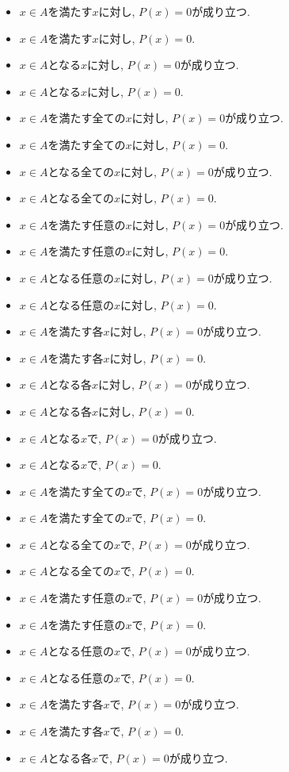 \documentclass[a4paper,12pt,draft]{amsart}
\newcommand{\PPP}[1]{P(#1)=0}
\begin{document}
\begin{itemize}
\item $x\in A$を満たす$x$に対し, $\PPP{x}$が成り立つ.
\item $x\in A$を満たす$x$に対し, $\PPP{x}$.
\item $x\in A$となる$x$に対し, $\PPP{x}$が成り立つ.
\item $x\in A$となる$x$に対し, $\PPP{x}$.
\item $x\in A$を満たす全ての$x$に対し, $\PPP{x}$が成り立つ.
\item $x\in A$を満たす全ての$x$に対し, $\PPP{x}$.
\item $x\in A$となる全ての$x$に対し, $\PPP{x}$が成り立つ.
\item $x\in A$となる全ての$x$に対し, $\PPP{x}$.
\item $x\in A$を満たす任意の$x$に対し, $\PPP{x}$が成り立つ.
\item $x\in A$を満たす任意の$x$に対し, $\PPP{x}$.
\item $x\in A$となる任意の$x$に対し, $\PPP{x}$が成り立つ.
\item $x\in A$となる任意の$x$に対し, $\PPP{x}$.
\item $x\in A$を満たす各$x$に対し, $\PPP{x}$が成り立つ.
\item $x\in A$を満たす各$x$に対し, $\PPP{x}$.
\item $x\in A$となる各$x$に対し, $\PPP{x}$が成り立つ.
\item $x\in A$となる各$x$に対し, $\PPP{x}$.
\item $x\in A$となる$x$で, $\PPP{x}$が成り立つ.
\item $x\in A$となる$x$で, $\PPP{x}$.
\item $x\in A$を満たす全ての$x$で, $\PPP{x}$が成り立つ.
\item $x\in A$を満たす全ての$x$で, $\PPP{x}$.
\item $x\in A$となる全ての$x$で, $\PPP{x}$が成り立つ.
\item $x\in A$となる全ての$x$で, $\PPP{x}$.
\item $x\in A$を満たす任意の$x$で, $\PPP{x}$が成り立つ.
\item $x\in A$を満たす任意の$x$で, $\PPP{x}$.
\item $x\in A$となる任意の$x$で, $\PPP{x}$が成り立つ.
\item $x\in A$となる任意の$x$で, $\PPP{x}$.
\item $x\in A$を満たす各$x$で, $\PPP{x}$が成り立つ.
\item $x\in A$を満たす各$x$で, $\PPP{x}$.
\item $x\in A$となる各$x$で, $\PPP{x}$が成り立つ.

\end{itemize}
\end{document}
